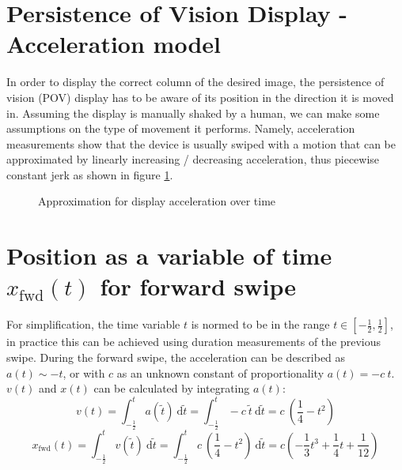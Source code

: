 \documentclass[a4paper, 11pt]{article}
\begin{document}
\section*{Persistence of Vision Display - Acceleration model}
In order to display the correct column of the desired image, the persistence of vision (POV) display has to be aware of its position in the direction it is moved in. Assuming the display is manually shaked by a human, we can make some assumptions on the type of movement it performs. Namely, acceleration measurements show that the device is usually swiped with a motion that can be approximated by linearly increasing / decreasing acceleration, thus piecewise constant jerk as shown in figure \ref{fig:acc}.

\begin{figure}
	\centering
	\caption{Approximation for display acceleration over time}
	\label{fig:acc}
\end{figure}

\section*{Position as a variable of time $x_{\mathrm{fwd}}(t)$ for forward swipe}
For simplification, the time variable $t$ is normed to be in the range $t \in \left[-\frac{1}{2}, \frac{1}{2} \right]$, in practice this can be achieved using duration measurements of the previous swipe. During the forward swipe, the acceleration can be described as $a(t) \sim -t$, or with $c$ as an unknown constant of proportionality $a(t) = -c ~ t$. $v(t)$ and $x(t)$ can be calculated by integrating $a(t)$:
\[
	v(t) =  \int_{-\frac{1}{2}}^t a(\tilde t) ~ \mathrm d \tilde t = \int_{-\frac{1}{2}}^t -c ~ \tilde t ~ \mathrm d \tilde t = c ~ \left(\frac{1}{4} - t^2 \right)
\]
\[
	x_{\mathrm{fwd}}(t) = \int_{-\frac{1}{2}}^t v(\tilde t) ~ \mathrm d \tilde t = \int_{-\frac{1}{2}}^t c ~ \left(\frac{1}{4} - t^2 \right) ~ \mathrm d \tilde t = c \left(- \frac{1}{3} t^3 + \frac{1}{4} t + \frac{1}{12} \right)
\]
\end{document}
